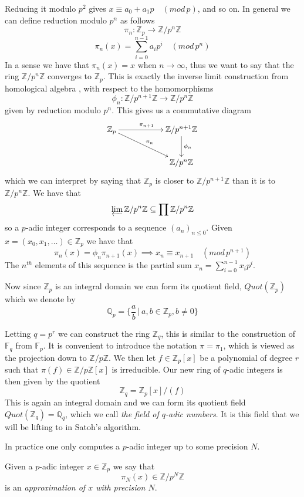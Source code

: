 Reducing it modulo $p^2$ gives $x \equiv a_0 + a_1p \quad (mod\, p)$, and so on. In general
we can define reduction modulo $p^n$ as follows
$$\pi_n: \mathbb{Z}_p \rightarrow \mathbb{Z}/p^n\mathbb{Z}$$
$$\pi_n(x) = \sum_{i=0}^{n-1} a_i p^i \quad (mod\, p^n) $$
In a sense we have that $\pi_n(x) = x$ when $n \rightarrow \infty$, thus we want to say that the ring
$\mathbb{Z}/p^n\mathbb{Z}$ converges to $\mathbb{Z}_p$. This is exactly the inverse
limit construction from homological algebra \cite{Rotman}, with respect to the homomorphisms
$$\phi_n: \mathbb{Z}/p^{n+1}\mathbb{Z} \rightarrow \mathbb{Z}/p^n\mathbb{Z} $$
given by reduction modulo $p^n$. This gives us a commutative diagram
$$
\xymatrix {
  \mathbb{Z}_p \ar[rr]^{\pi_{n+1}} \ar[drr]^{\pi_n} & & \mathbb{Z}/p^{n+1}\mathbb{Z} \ar[d]^{\phi_n} \\
  & & \mathbb{Z}/p^n\mathbb{Z}
}
$$
which we can interpret by saying that $\mathbb{Z}_p$ is closer to $\mathbb{Z}/p^{n+1}\mathbb{Z}$ than it is to
$\mathbb{Z}/p^n\mathbb{Z}$. We have that
$$\varprojlim \mathbb{Z}/p^n\mathbb{Z} \subseteq \prod \mathbb{Z}/p^n\mathbb{Z}$$ so a $p$-adic
integer corresponds to a sequence $(a_n)_{n\leq0}$.
Given $x=(x_0, x_1, \ldots) \in \mathbb{Z}_p$ we have that 
$$\pi_n(x) = \phi_n\pi_{n+1}(x) \implies x_n \equiv x_{n+1} \quad (mod\, p^{n+1})$$
The $n^{th}$ elements of this sequence is the partial sum $x_n = \sum_{i=0}^{n-1} x_i p^i$.

Now since $\mathbb{Z}_p$ is an integral domain we can form its quotient field, $Quot(\mathbb{Z}_p)$
which we denote by
$$\mathbb{Q}_p = \{\frac{a}{b}\, |\, a,b \in \mathbb{Z}_p, b\neq 0\}$$ 

Letting $q=p^r$ we can construct the ring $\mathbb{Z}_q$, this is similar to the construction
of $\mathbb{F}_q$ from $\mathbb{F}_p$. It is convenient to introduce the notation
$\pi=\pi_1$, which is viewed as the projection down to $\mathbb{Z}/p\mathbb{Z}$.
We then let $f \in \mathbb{Z}_p[x]$ be a polynomial
of degree $r$ such that $\pi(f) \in \mathbb{Z}/p\mathbb{Z}[x]$ is irreducible.
Our new ring of $q$-adic integers is then given by the quotient
$$\mathbb{Z}_q = \mathbb{Z}_p[x]/(f) $$
This is again an integral domain  and we can form its quotient field $Quot(\mathbb{Z}_q) = \mathbb{Q}_q$,
which we call \emph{the field of $q$-adic numbers}. It is this field that we will
be lifting to in Satoh's algorithm.

In practice one only computes a $p$-adic integer up to some precision $N$.
\begin{mydef}
 Given a $p$-adic integer $x \in \mathbb{Z}_p$ we say that 
$$\pi_N(x) \in \mathbb{Z}/p^N\mathbb{Z}$$
is an \emph{approximation of $x$ with precision $N$}.
\end{mydef}